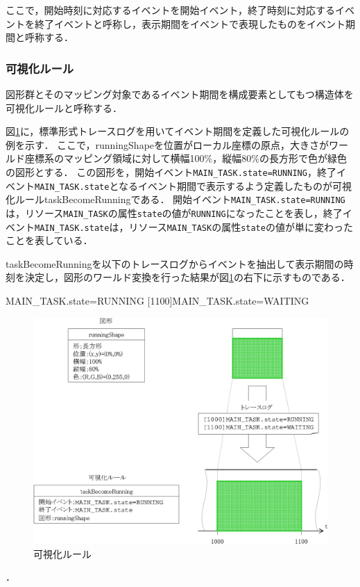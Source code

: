 ここで，開始時刻に対応するイベントを開始イベント，終了時刻に対応するイベントを終了イベントと呼称し，表示期間をイベントで表現したものをイベント期間と呼称する．

\subsubsection{可視化ルール}
図形群とそのマッピング対象であるイベント期間を構成要素としてもつ構造体を可視化ルールと呼称する．

図\ref{fig:timeShape}に，標準形式トレースログを用いてイベント期間を定義した可視化ルールの例を示す．
ここで，runningShapeを位置がローカル座標の原点，大きさがワールド座標系のマッピング領域に対して横幅100\%，縦幅80\%の長方形で色が緑色の図形とする．
この図形を，開始イベント\verb|MAIN_TASK.state=RUNNING|，終了イベント\verb|MAIN_TASK.state|となるイベント期間で表示するよう定義したものが可視化ルールtaskBecomeRunningである．
開始イベント\verb|MAIN_TASK.state=RUNNING|は，リソース\verb|MAIN_TASK|の属性\verb|state|の値が\verb|RUNNING|になったことを表し，終了イベント\verb|MAIN_TASK.state|は，リソース\verb|MAIN_TASK|の属性\verb|state|の値が単に変わったことを表している．

taskBecomeRunningを以下のトレースログからイベントを抽出して表示期間の時刻を決定し，図形のワールド変換を行った結果が図\ref{fig:timeShape}の右下に示すものである．

\begin{FileNoTitle}
[1000]MAIN_TASK.state=RUNNING
[1100]MAIN_TASK.state=WAITING
\end{FileNoTitle}
\vfill
\begin{figure}[h]
\begin{center}
\includegraphics[scale=0.9]{img/timeShape.eps}
\caption{可視化ルール}
\label{fig:timeShape}
\end{center}
\end{figure}
．
